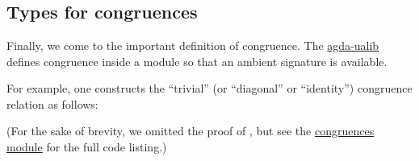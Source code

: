 \documentclass[sigplan,screen]{acmart}
\newcommand\ab[1]{\AgdaBound{#1}}
\newcommand\congruencesmodule{\href{https://gitlab.com/ualib/ualib.gitlab.io/-/blob/master/congruences.lagda.rst}{congruences module}\xspace}
\newcommand{\agdaualib}{\href{https://ualib.org}{agda-ualib}\xspace}
\newcommand{\agdaualib}{\href{anonymizedLink/agda-ualib.html}{agda-ualib}\xspace}
\newcommand\congruencesmodule{\href{anonymizedLink/congruences.lagda.rst}{congruences module}\xspace}
\begin{document}
\begin{code}\>[0]\AgdaSpace{}%
\AgdaSymbol{:}%
\>[806I]\AgdaSymbol{\{}\AgdaSpace{}%
\AgdaSymbol{:}\AgdaSpace{}%
\AgdaSpace{}%
\AgdaSpace{}%
\AgdaSymbol{\}}\AgdaSpace{}%
\AgdaSymbol{\{}\AgdaSpace{}%
\AgdaSymbol{:}\AgdaSpace{}%
\AgdaSpace{}%
\AgdaSpace{}%
\AgdaSymbol{\}}\<%
\\
\>[.][@{}l@{}]\<[806I]%
\>[17]\AgdaSymbol{(}\AgdaSpace{}%
\AgdaSymbol{:}\AgdaSpace{}%
\AgdaSymbol{(}\AgdaSpace{}%
\AgdaSpace{}%
\AgdaSymbol{)}\AgdaSpace{}%
\AgdaSpace{}%
\AgdaSymbol{)(}\AgdaSpace{}%
\AgdaSymbol{:}\AgdaSpace{}%
\AgdaSpace{}%
\AgdaSpace{}%
\AgdaSymbol{)}\<%
\\
\>[0][@{}l@{\AgdaIndent{0}}]%
\>[1]%
\>[17]\AgdaSpace{}%
\AgdaSpace{}%
\AgdaSpace{}%
\AgdaSpace{}%
\AgdaSpace{}%
\<%
\\
\>[0]\AgdaSpace{}%
\AgdaSpace{}%
%
\>[20]\AgdaSymbol{=}\AgdaSpace{}%
\AgdaSymbol{(}\AgdaSpace{}%
\AgdaSymbol{)}\AgdaSpace{}%
\AgdaOperator{\AgdaFunction{=[}}\AgdaSpace{}%
\AgdaSpace{}%
\AgdaOperator{\AgdaFunction{]⇒}}\AgdaSpace{}%
\<%
\end{code}

\subsection{Types for congruences}\label{types-for-congruences}
Finally, we come to the important definition of congruence. The \agdaualib defines congruence inside a module so that an ambient signature \ab 𝑆 is available.
\begin{code}\end{code}

For example, one constructs the ``trivial'' (or ``diagonal'' or ``identity'') congruence relation as follows:
\begin{code}\end{code}
(For the sake of brevity, we omitted the proof of , but see the \congruencesmodule for the full code listing.)
\end{document}
